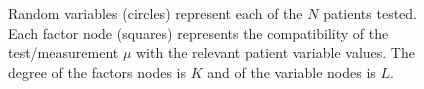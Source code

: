 \documentclass{article}
\begin{document}
\begin{figure}[h]
    
    \caption{Random variables (circles) represent each of the $N$ patients tested. Each factor node (squares) represents the compatibility of the test/measurement $\mu$ with the relevant patient variable values. The degree of the factors nodes is $K$ and of the variable nodes is $L$.}
    \label{fig:factor_graph}
\end{figure}
\end{document}
